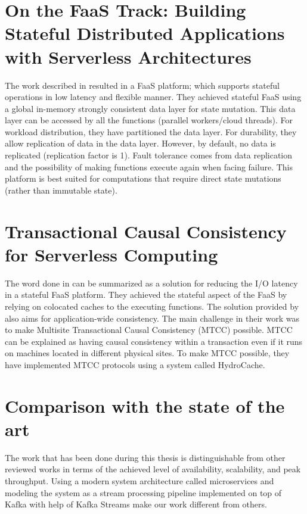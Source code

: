 \documentclass[a4]{report}
\begin{document}
    \section{On the FaaS Track: Building Stateful Distributed Applications with Serverless Architectures}
    The work described in \cite{mutableStateless} resulted in a FaaS platform;
    which supports stateful operations in low latency and flexible manner.
    They achieved stateful FaaS using a global in-memory strongly consistent data layer for state mutation.
    This data layer can be accessed by all the functions (parallel workers/cloud threads).
    For workload distribution, they have partitioned the data layer.
    For durability, they allow replication of data in the data layer.
    However, by default, no data is replicated (replication factor is 1).
    Fault tolerance comes from data replication and the possibility of making functions execute again when facing failure.
    This platform is best suited for computations that require direct state mutations (rather than immutable state).

    \section{Transactional Causal Consistency for Serverless Computing}
    The word done in \cite{casualConsistency} can be summarized as a solution for reducing the I/O latency in a stateful FaaS platform.
    They achieved the stateful aspect of the FaaS by relying on colocated caches to the executing functions.
    The solution provided by \cite{casualConsistency} also aims for application-wide consistency.
    The main challenge in their work was to make Multisite Transactional Causal Consistency (MTCC) possible.
    MTCC can be explained as having causal consistency within a transaction even if it runs on machines located in different physical sites.
    To make MTCC possible, they have implemented MTCC protocols using a system called HydroCache.


    \section{Comparison with the state of the art}
    The work that has been done during this thesis is distinguishable from other reviewed works in terms of the
    achieved level of availability, scalability, and peak throughput.
    Using a modern system architecture called microservices and modeling the system as a stream processing pipeline
    implemented on top of Kafka with help of Kafka Streams make our work different from others.
\end{document}
